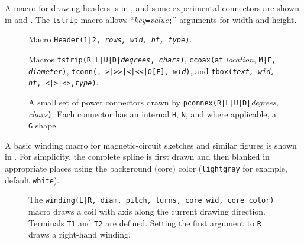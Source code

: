 A macro for drawing headers is in ,
and some experimental connectors are shown in  and .
The {\tt tstrip} macro allows ``{\sl key}{\tt =}{\sl value}{\tt ;}'' arguments
for width and height.
\begin{figure}[h!t]
   
   \caption{Macro {\tt Header(1|2, {\sl rows, wid, ht, type})}.}
   \label{Headers}
   \end{figure}
\begin{figure}[h!t]
   
   \caption{Macros {\tt tstrip(R|L|U|D|{\sl degrees}, {\sl chars})},
     {\tt ccoax(at} {\sl location}, {\tt M|F, {\sl diameter})},
     {\tt tconn(\linespec, >|>>|<|<<|O[F], {\sl wid})}, and
     {\tt tbox({\sl text, wid, ht}, <|>|<>,{\sl type})}. }
   \label{Conn}
   \end{figure}
\begin{figure}[h!t]
   
   \caption{A small set of power connectors drawn by
    {\tt pconnex(R|L|U|D|}{\sl degrees, chars}{\tt)}. Each connector has
    an internal {\tt H}, {\tt N}, and where applicable, a {\tt G} shape.}
   \label{Pconn}
   \end{figure}

\pagebreak
A basic winding macro for magnetic-circuit sketches and similar figures
is shown in .
For simplicity, the complete spline
is first drawn and then blanked in appropriate places using the background
(core) color (\verb!lightgray! for example, default \verb!white!).
\begin{figure}[h!t]
   \vspace*{-\baselineskip}%
   
   \caption{The {\tt winding(L|R, diam, pitch, turns, core wid, core color)}
     macro draws a coil with axis along the current drawing direction.
     Terminals {\tt T1} and {\tt T2} are defined.
     Setting the first argument to {\tt R} draws a right-hand winding.}
   \label{Windings}
   \end{figure}

